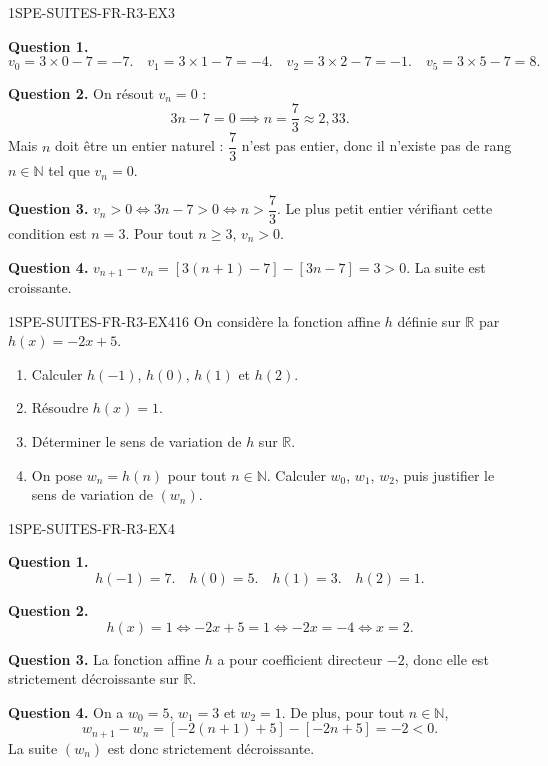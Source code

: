 \begin{corrige}{1SPE-SUITES-FR-R3-EX3}

\textbf{Question 1.}
\[
v_0 = 3 \times 0 - 7 = -7. \quad v_1 = 3 \times 1 - 7 = -4. \quad v_2 = 3 \times 2 - 7 = -1. \quad v_5 = 3 \times 5 - 7 = 8.
\]

\textbf{Question 2.} On résout $v_n = 0$ :
\[
3n - 7 = 0 \implies n = \frac{7}{3} \approx 2{,}33.
\]
Mais $n$ doit être un entier naturel : $\dfrac{7}{3}$ n'est pas entier, donc il n'existe pas de rang $n \in \mathbb{N}$ tel que $v_n = 0$.


\textbf{Question 3.} $v_n > 0 \iff 3n - 7 > 0 \iff n > \dfrac{7}{3}$. Le plus petit entier vérifiant cette condition est $n = 3$. Pour tout $n \geq 3$, $v_n > 0$.

\textbf{Question 4.} $v_{n+1} - v_n = [3(n+1) - 7] - [3n - 7] = 3 > 0$. La suite est croissante.

\end{corrige}


\begin{exercice}{1SPE-SUITES-FR-R3-EX4}{1}{6}
On considère la fonction affine $h$ définie sur $\mathbb{R}$ par
$h(x)=-2x+5$.
\begin{enumerate}
  \item Calculer $h(-1)$, $h(0)$, $h(1)$ et $h(2)$.
  \item Résoudre $h(x)=1$.
  \item Déterminer le sens de variation de $h$ sur $\mathbb{R}$.
  \item On pose $w_n=h(n)$ pour tout $n\in\mathbb{N}$. Calculer $w_0$,
  $w_1$, $w_2$, puis justifier le sens de variation de $(w_n)$.
\end{enumerate}
\end{exercice}


\begin{corrige}{1SPE-SUITES-FR-R3-EX4}

\textbf{Question 1.}
\[
h(-1)=7. \quad h(0)=5. \quad h(1)=3. \quad h(2)=1.
\]

\textbf{Question 2.}
\[
h(x)=1 \iff -2x+5=1 \iff -2x=-4 \iff x=2.
\]


\textbf{Question 3.} La fonction affine $h$ a pour coefficient directeur
$-2$, donc elle est strictement décroissante sur $\mathbb{R}$.

\textbf{Question 4.} On a $w_0=5$, $w_1=3$ et $w_2=1$. De plus,
pour tout $n\in\mathbb{N}$,
\[
w_{n+1}-w_n=[-2(n+1)+5]-[-2n+5]=-2<0.
\]
La suite $(w_n)$ est donc strictement décroissante.

\end{corrige}
